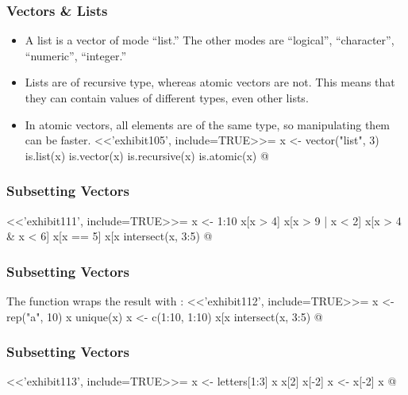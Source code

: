 \begin{frame}[fragile]%
\frametitle{Vectors \& Lists}
\begin{itemize}
\item A list is a vector of mode ``list.'' The other modes are ``logical'', ``character'', ``numeric'', ``integer.'' 
\item Lists are of recursive type, whereas atomic vectors are not. This means that they can contain values of different types, even other lists. 
\item In atomic vectors, all elements are of the same type, so manipulating them can be faster.
<<'exhibit105', include=TRUE>>=
  x <- vector("list", 3)
  is.list(x)
  is.vector(x)
  is.recursive(x)
  is.atomic(x) 
@
\end{itemize}
\end{frame}


\begin{frame}[fragile]%
\frametitle{Subsetting Vectors}
<<'exhibit111', include=TRUE>>=
  x <- 1:10
  x[x > 4]
  x[x > 9 | x < 2]
  x[x > 4 & x < 6]  
  x[x == 5]
  x[x %
  intersect(x, 3:5)
@
\end{frame}


\begin{frame}[fragile]%
\frametitle{Subsetting Vectors}
The function  wraps the result with :
<<'exhibit112', include=TRUE>>=
  x <- rep("a", 10)
  x
  unique(x)
  x <- c(1:10, 1:10)
  x[x %
  intersect(x, 3:5)
@
\end{frame}


\begin{frame}[fragile]%
\frametitle{Subsetting Vectors}
<<'exhibit113', include=TRUE>>=
  x <- letters[1:3]
  x
  x[2]
  x[-2]
  x <- x[-2]
  x
@
\end{frame}


